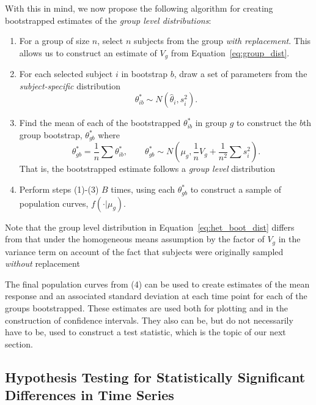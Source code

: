 \documentclass{article}
\begin{document}
With this in mind, we now propose the following algorithm for creating bootstrapped estimates of the \textit{group level distributions}:




\begin{enumerate}
\item For a group of size $n$, select $n$ subjects from the group \textit{with replacement}. This allows us to construct an estimate of $V_{g}$ from Equation~\ref{eq:group_dist}.
\item For each selected subject $i$ in bootstrap $b$, draw a set of parameters from the \textit{subject-specific} distribution 
\begin{equation}
\theta_{ib}^* \sim N(\hat{\theta}_i, s_i^2).
\end{equation}
\item Find the mean of each of the bootstrapped $\theta_{ib}^*$ in group $g$ to construct the $b$th group bootstrap, $\theta_{gb}^*$ where
\begin{equation}\label{eq:het_boot_dist}
\theta_{gb}^* = \frac1n \sum  \theta_{ib}^*, \qquad \theta_{gb}^* \sim N \left(\mu_g, \frac{1}{n} V_g + \frac{1}{n^2} \sum s_i^2 \right).
\end{equation}
That is, the bootstrapped estimate follows a \textit{group level} distribution
\item Perform steps (1)-(3) $B$ times, using each $\theta_{gb}^*$ to construct a sample of population curves, $f(\cdot| \mu_g)$.
\end{enumerate}

Note that the group level distribution in Equation~\ref{eq:het_boot_dist} differs from that under the homogeneous means assumption by the factor of $V_g$ in the variance term on account of the fact that subjects were originally sampled \emph{without} replacement


The final population curves from (4) can be used to create estimates of the mean response and an associated standard deviation at each time point for each of the groups bootstrapped. These estimates are used both for plotting and in the construction of confidence intervals. They also can be, but do not necessarily have to be, used to construct a test statistic, which is the topic of our next section.

\subsection{Hypothesis Testing  for Statistically Significant Differences in Time Series}
\end{document}
